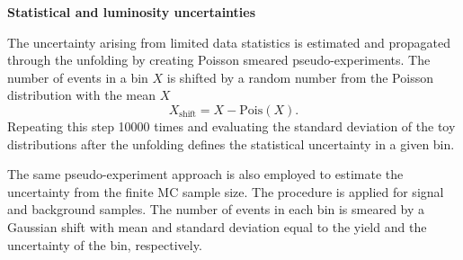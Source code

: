 \vspace{.5cm}
\noindent
\textbf{Statistical and luminosity uncertainties}
\vspace{.5cm}

\noindent
The uncertainty arising from limited data statistics is estimated and propagated through the unfolding by creating Poisson smeared pseudo-experiments.
The number of events in a bin $X$ is shifted by a random number from the Poisson distribution with the mean $X$
\begin{equation}
    X_\text{shift} = X - \text{Pois}(X).
\end{equation}
Repeating this step 10000 times and evaluating the standard deviation of the toy distributions after the unfolding defines the statistical uncertainty in a given bin.

The same pseudo-experiment approach is also employed to estimate the uncertainty from the finite MC sample size.
The procedure is applied for signal and background samples.
The number of events in each bin is smeared by a Gaussian shift with mean and standard deviation equal to the yield and the uncertainty of the bin, respectively.

